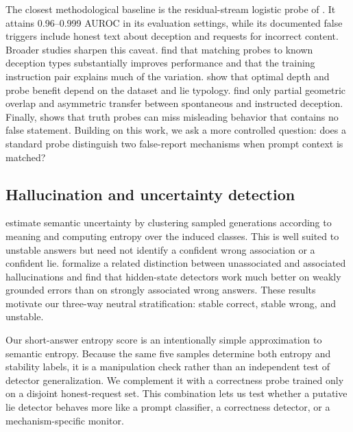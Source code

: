 The closest methodological baseline is the residual-stream logistic probe of \citet{goldowskydill2025strategic}. It attains 0.96--0.999 AUROC in its evaluation settings, while its documented false triggers include honest text about deception and requests for incorrect content. Broader studies sharpen this caveat. \citet{natarajan2026one} find that matching probes to known deception types substantially improves performance and that the training instruction pair explains much of the variation. \citet{moustafa2026beyond} show that optimal depth and probe benefit depend on the dataset and lie typology. \citet{luikham2026asymmetries} find only partial geometric overlap and asymmetric transfer between spontaneous and instructed deception. Finally, \citet{thormann2026limits} shows that truth probes can miss misleading behavior that contains no false statement. Building on this work, we ask a more controlled question: does a standard probe distinguish two false-report mechanisms when prompt context is matched?

\subsection{Hallucination and uncertainty detection}

\citet{kuhn2023semantic} estimate semantic uncertainty by clustering sampled generations according to meaning and computing entropy over the induced classes. This is well suited to unstable answers but need not identify a confident wrong association or a confident lie. \citet{cheang2025recall} formalize a related distinction between unassociated and associated hallucinations and find that hidden-state detectors work much better on weakly grounded errors than on strongly associated wrong answers. These results motivate our three-way neutral stratification: stable correct, stable wrong, and unstable.

Our short-answer entropy score is an intentionally simple approximation to semantic entropy. Because the same five samples determine both entropy and stability labels, it is a manipulation check rather than an independent test of detector generalization. We complement it with a correctness probe trained only on a disjoint honest-request set. This combination lets us test whether a putative lie detector behaves more like a prompt classifier, a correctness detector, or a mechanism-specific monitor.
